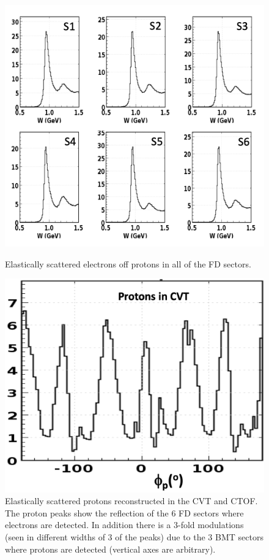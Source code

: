 \documentclass[final,3p,twocolumn]{elsarticle}
\begin{document}
\begin{figure}[t!]
\centerline{\includegraphics[width=0.9\columnwidth]{elastic-electrons.png}}
\caption{Elastically scattered electrons off protons in all of the FD sectors.}
\label{elastic-electrons}
\vspace{0.3cm}\centerline{\includegraphics[width=0.8\columnwidth]{CVT-elastic-protons.png}}
\caption{Elastically scattered protons reconstructed in the CVT and CTOF. The proton peaks show the reflection of
  the 6 FD sectors where electrons are detected. In addition there is a 3-fold modulations (seen in different widths
  of 3 of the peaks) due to the 3 BMT sectors where protons are detected (vertical axes are arbitrary).}
\label{CVT-elastic-protons}
\end{figure}
\end{document}
